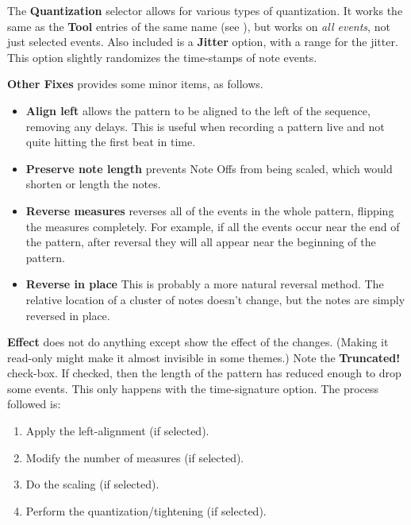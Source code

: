    The \textbf{Quantization} selector allows for various types of
   quantization.
   It works the same as the \textbf{Tool} entries of the
   same name (see ),
   but works on \textsl{all events}, not just selected events.
   Also included is a \textbf{Jitter} option, with a range for the jitter.
   This option slightly randomizes the time-stamps of note events.

   \textbf{Other Fixes} provides some minor items, as follows.

   \begin{itemize}
      \item \textbf{Align left}
         allows the pattern to be aligned to the left of the sequence, removing
         any delays.  This is useful when recording a pattern live and not quite
         hitting the first beat in time.
      \item \textbf{Preserve note length}
         prevents Note Offs from being scaled, which would shorten or length the
         notes.
      \item \textbf{Reverse measures}
         reverses all of the events in the whole pattern, flipping the measures
         completely.  For example, if all the events occur near the end of the
         pattern, after reversal they will all appear near the beginning of the
         pattern.
      \item \textbf{Reverse in place}
         This is probably a more natural reversal method.
         The relative location of a cluster of notes doesn't change, but the
         notes are simply reversed in place.
   \end{itemize}


   \textbf{Effect} does not do anything except show the effect of the changes.
   (Making it read-only might make it almost invisible in some themes.)
   Note the \textbf{Truncated!} check-box.  If checked, then
   the length of the pattern has reduced enough to drop some events.
   This only happens with the time-signature option.
   The process followed is:

   \begin{enumerate}
      \item Apply the left-alignment (if selected).
      \item Modify the number of measures (if selected).
      \item Do the scaling (if selected).
      \item Perform the quantization/tightening (if selected).
   \end{enumerate}

